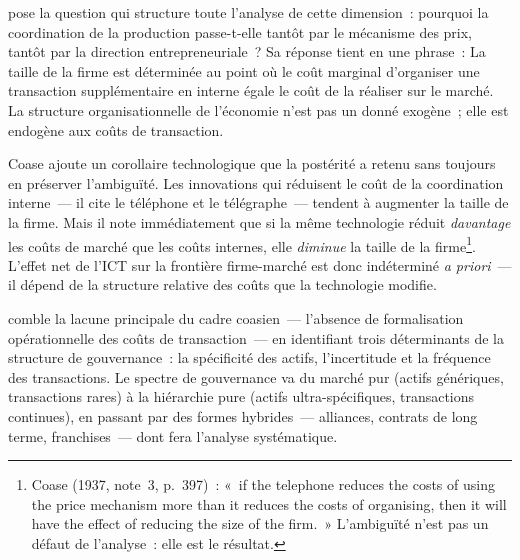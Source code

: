 \markINST
\textcite{coase_nature_1937} pose la question qui structure toute l'analyse de cette dimension~: pourquoi la coordination de la production passe-t-elle tantôt par le mécanisme des prix, tantôt par la direction entrepreneuriale~? Sa réponse tient en une phrase~:  La taille de la firme est déterminée au point où le coût marginal d'organiser une transaction supplémentaire en interne égale le coût de la réaliser sur le marché. La structure organisationnelle de l'économie n'est pas un donné exogène~; elle est endogène aux coûts de transaction.

Coase ajoute un corollaire technologique que la postérité a retenu sans toujours en préserver l'ambiguïté. Les innovations qui réduisent le coût de la coordination interne~--- il cite le téléphone et le télégraphe~--- tendent à augmenter la taille de la firme. Mais il note immédiatement que si la même technologie réduit \emph{davantage} les coûts de marché que les coûts internes, elle \emph{diminue} la taille de la firme\footnote{Coase (1937, note~3, p.~397)~: «~if the telephone reduces the costs of using the price mechanism more than it reduces the costs of organising, then it will have the effect of reducing the size of the firm.~» L'ambiguïté n'est pas un défaut de l'analyse~: elle est le résultat.}. L'effet net de l'ICT sur la frontière firme-marché est donc indéterminé \emph{a priori}~--- il dépend de la structure relative des coûts que la technologie modifie.

\markINST
\textcite{williamson_economic_1985} comble la lacune principale du cadre coasien~--- l'absence de formalisation opérationnelle des coûts de transaction~--- en identifiant trois déterminants de la structure de gouvernance~: la spécificité des actifs, l'incertitude et la fréquence des transactions.  Le spectre de gouvernance va du marché pur (actifs génériques, transactions rares) à la hiérarchie pure (actifs ultra-spécifiques, transactions continues), en passant par des formes hybrides~--- alliances, contrats de long terme, franchises~--- dont \textcite{williamson_comparative_1991} fera l'analyse systématique.

